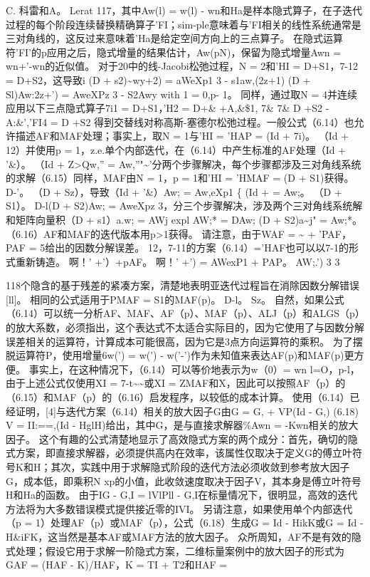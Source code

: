 \documentclass[UTF8,11pt,a4paper,openany,fontset=fandol]{ctexbook}
\begin{document}
C. 科雷和A。 Lerat 117，其中Aw(l) = w(l) - wn和Ha是样本隐式算子，在子迭代过程的每个阶段连续替换精确算子'FI；sim-ple意味着与'FI相关的线性系统通常是三对角线的，这反过来意味着'Ha是给定空间方向上的三点算子。 在隐式运算符'FI'的p应用之后，隐式增量的结果估计，Aw(pN)，保留为隐式增量Awn = wn+'-wn的近似值。 对于20中的线-Jacobi松弛过程，N = 2和'HI = D+S1，7-12 = D+S2，这导致i (D + s2)\textasciitilde{}wy+2) = aWeXp1 3 - s1aw,(2z+1) (D + Sl)Aw:2z+') = AweXPz 3 - S2Awy with 1 = 0,p- 1。 同样，通过取N = 4并连续应用以下三点隐式算子7i1 = D+S1，'H2 = D+\& +A,\&\$1, 7\& 7\& D +S2 -A:\&','FI4 = D +S2 得到交替线对称高斯-塞德尔松弛过程。一般公式（6.14）也允许描述AF和MAF处理；事实上，取N = 1与'HI = 'HAP = (Id + 7i)。 （Id + 12）并使用p = 1，z.e.单个内部迭代，在（6.14）中产生标准的AF处理（Id + '\&）。 （Id + Z>Qw,” = Aw,”"\textasciitilde{}'分两个步骤解决，每个步骤都涉及三对角线系统的求解（6.15）同样，MAF由N = 1，p = 1和'HI = 'HMAF = (D + S1)获得。 D-'。 （D + Sz），导致（Id + '\&）Aw; = Aw,eXp1 \{ (Id + = Aw;。 （D + S1）。 D-l(D + S2)Aw; = AweXpz 3，分三个步骤解决，涉及两个三对角线系统解和矩阵向量积（D + s1）a.w; = AWj expl AW;* = DAw; (D + S2)a\textasciitilde{}j" = Aw;*。 （6.16）AF和MAF的迭代版本用p>1获得。 请注意，由于WAF = \textasciitilde{} + 'PAF，PAF = 5给出的因数分解误差。 12，7-11的方案（6.14）='HAF也可以以7-1的形式重新铸造。 啊！' +'）+pAF。 啊！' +') = AWexP1 + PAP。 AW;.') 3 3

118个隐含的基于残差的紧凑方案，清楚地表明亚迭代过程旨在消除因数分解错误[ll]。 相同的公式适用于PMAF = S1的MAF(p)。 D-l。 Sz。 自然，如果公式（6.14）可以统一分析AF、MAF、AF（p）、MAF（p）、ALJ（p）和ALGS（p）的放大系数，必须指出，这个表达式不太适合实际目的，因为它使用了与因数分解误差相关的运算符，计算成本可能很高，因为它是3点方向运算符的乘积。 为了摆脱运算符P，使用增量6w(') = w(') - w('-')作为未知值来表达AF(p)和MAF(p)更方便。 事实上，在这种情况下，（6.14）可以等价地表示为w（0）= wn l=O，p-l，由于上述公式仅使用XI = 7-t\textasciitilde{}\textasciitilde{}或XI = ZMAF和X，因此可以按照AF（p）的（6.15）和MAF（p）的（6.16）启发程序，以较低的成本计算。 使用（6.14）已经证明，[4]与迭代方案（6.14）相关的放大因子G由G = G, + VP(Id - G,) (6.18) V = II:==,(Id - HglH)给出，其中G，是与直接求解器\%Awn = -Kwn相关的放大因子。 这个有趣的公式清楚地显示了高效隐式方案的两个成分：首先，确切的隐式方案，即直接求解器，必须提供高内在效率，该属性仅取决于定义G的傅立叶符号K和H；其次，实践中用于求解隐式阶段的迭代方法必须收敛到参考放大因子G，成本低，即乘积N xp的小值，此收敛速度取决于因子V，其本身是傅立叶符号H和Ha的函数。 由于IG - G,I = lVlPll - G,I在标量情况下，很明显，高效的迭代方法将为大多数错误模式提供接近零的IVI。 另请注意，如果使用单个内部迭代（p = 1）处理AF（p）或MAF（p），公式（6.18）生成G = Id - HikK或G = Id - H\&iFK，这当然是基本AF或MAF方法的放大因子。 众所周知，AF不是有效的隐式处理；假设它用于求解一阶隐式方案，二维标量案例中的放大因子的形式为GAF = (HAF - K)/HAF，K = TI + T2和HAF =
\end{document}
